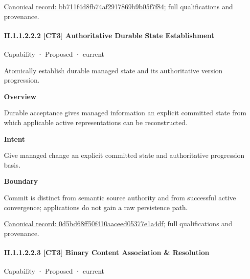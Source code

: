 {\footnotesize \href{../../../../continuum/strategy/capability/bb711f4d8fb74af2917869b9b05f7f84.md}{Canonical record: bb711f4d8fb74af2917869b9b05f7f84}; full qualifications and provenance.}\par
\paragraph*{II.1.1.2.2.2 [CT3] Authoritative Durable State Establishment}
\label{navigation:II.1.1.2.2.2}

\label{element:0d5bd68ff50f410aaceed05377e1a4df}
{\small Capability · Proposed · current}\par

Atomically establish durable managed state and its authoritative version progression.



\textbf{Overview}



Durable acceptance gives managed information an explicit committed state from which applicable active representations can be reconstructed.



\textbf{Intent}



Give managed change an explicit committed state and authoritative progression basis.



\textbf{Boundary}



Commit is distinct from semantic source authority and from successful active convergence; applications do not gain a raw persistence path.


{\footnotesize \href{../../../../continuum/strategy/capability/0d5bd68ff50f410aaceed05377e1a4df.md}{Canonical record: 0d5bd68ff50f410aaceed05377e1a4df}; full qualifications and provenance.}\par
\paragraph*{II.1.1.2.2.3 [CT3] Binary Content Association \& Resolution}
\label{navigation:II.1.1.2.2.3}

\label{element:5314959509dc4b558711ec169ddee5a0}
{\small Capability · Proposed · current}\par

